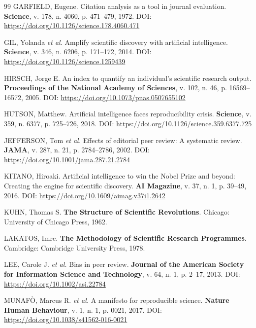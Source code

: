 \begin{thebibliography}{99}
GARFIELD, Eugene.
Citation analysis as a tool in journal evaluation.
\textbf{Science}, v. 178, n. 4060, p. 471--479, 1972.
DOI: \url{https://doi.org/10.1126/science.178.4060.471}

GIL, Yolanda \textit{et al.}
Amplify scientific discovery with artificial intelligence.
\textbf{Science}, v. 346, n. 6206, p. 171--172, 2014.
DOI: \url{https://doi.org/10.1126/science.1259439}

HIRSCH, Jorge E.
An index to quantify an individual's scientific research output.
\textbf{Proceedings of the National Academy of Sciences},
v. 102, n. 46, p. 16569--16572, 2005.
DOI: \url{https://doi.org/10.1073/pnas.0507655102}

HUTSON, Matthew.
Artificial intelligence faces reproducibility crisis.
\textbf{Science}, v. 359, n. 6377, p. 725--726, 2018.
DOI: \url{https://doi.org/10.1126/science.359.6377.725}

JEFFERSON, Tom \textit{et al.}
Effects of editorial peer review: A systematic review.
\textbf{JAMA}, v. 287, n. 21, p. 2784--2786, 2002.
DOI: \url{https://doi.org/10.1001/jama.287.21.2784}

KITANO, Hiroaki.
Artificial intelligence to win the Nobel Prize and beyond: Creating
the engine for scientific discovery.
\textbf{AI Magazine}, v. 37, n. 1, p. 39--49, 2016.
DOI: \url{https://doi.org/10.1609/aimag.v37i1.2642}

KUHN, Thomas S.
\textbf{The Structure of Scientific Revolutions}.
Chicago: University of Chicago Press, 1962.

LAKATOS, Imre.
\textbf{The Methodology of Scientific Research Programmes}.
Cambridge: Cambridge University Press, 1978.

LEE, Carole J. \textit{et al.}
Bias in peer review.
\textbf{Journal of the American Society for Information Science and
Technology}, v. 64, n. 1, p. 2--17, 2013.
DOI: \url{https://doi.org/10.1002/asi.22784}

MUNAFÒ, Marcus R. \textit{et al.}
A manifesto for reproducible science.
\textbf{Nature Human Behaviour}, v. 1, n. 1, p. 0021, 2017.
DOI: \url{https://doi.org/10.1038/s41562-016-0021}


\end{thebibliography}
